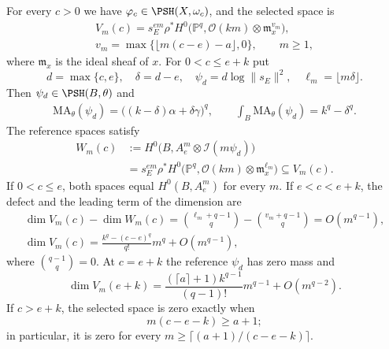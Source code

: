 \begin{proposition}\label{prop:exceptional-coefficient-series}
For every $c>0$ we have $\varphi_c\in\PSH(X,\omega_c)$, and the selected space is
\[
 \begin{gathered}
 V_m(c)=s_E^{em}\rho^*H^0\bigl(\mathbb P^q,\mathcal O(km)\otimes\mathfrak m_x^{v_m}\bigr),\\
 v_m=\max\{\lfloor m(c-e)-a\rfloor,0\},\qquad m\geq1,
 \end{gathered}
\]
where $\mathfrak m_x$ is the ideal sheaf of $x$. For $0<c\leq e+k$ put
\[
 d=\max\{c,e\},\quad \delta=d-e,\quad
 \psi_d=d\log\|s_E\|^2,\quad \ell_m=\lfloor m\delta\rfloor.
\]
Then $\psi_d\in\PSH(B,\theta)$ and
\[
 \begin{gathered}
 \mathrm{MA}_\theta(\psi_d)=\bigl((k-\delta)\alpha+\delta\gamma\bigr)^q,
 \qquad \int_B\mathrm{MA}_\theta(\psi_d)=k^q-\delta^q.
 \end{gathered}
\]
The reference spaces satisfy
\[
 \begin{split}
 W_m(c)&:=H^0\bigl(B,A_e^m\otimes\mathcal I(m\psi_d)\bigr)\\
   &=s_E^{em}\rho^*H^0\bigl(\mathbb P^q,\mathcal O(km)\otimes\mathfrak m_x^{\ell_m}\bigr)
   \subseteq V_m(c).
 \end{split}
\]
If $0<c\leq e$, both spaces equal $H^0(B,A_e^m)$ for every $m$. If $e<c<e+k$, the defect and the leading term of the dimension are
\[
 \begin{gathered}
 \dim V_m(c)-\dim W_m(c)
    =\binom{\ell_m+q-1}{q}-\binom{v_m+q-1}{q}=O(m^{q-1}),\\
 \dim V_m(c)=\frac{k^q-(c-e)^q}{q!}m^q+O(m^{q-1}),
 \end{gathered}
\]
where $\binom{q-1}{q}=0$. At $c=e+k$ the reference $\psi_d$ has zero mass and
\[
 \dim V_m(e+k)
   =\frac{(\lceil a\rceil+1)k^{q-1}}{(q-1)!}m^{q-1}+O(m^{q-2}).
\]
If $c>e+k$, the selected space is zero exactly when
\[
 m(c-e-k)\geq a+1;
\]
in particular, it is zero for every $m\geq\lceil(a+1)/(c-e-k)\rceil$.
\end{proposition}
